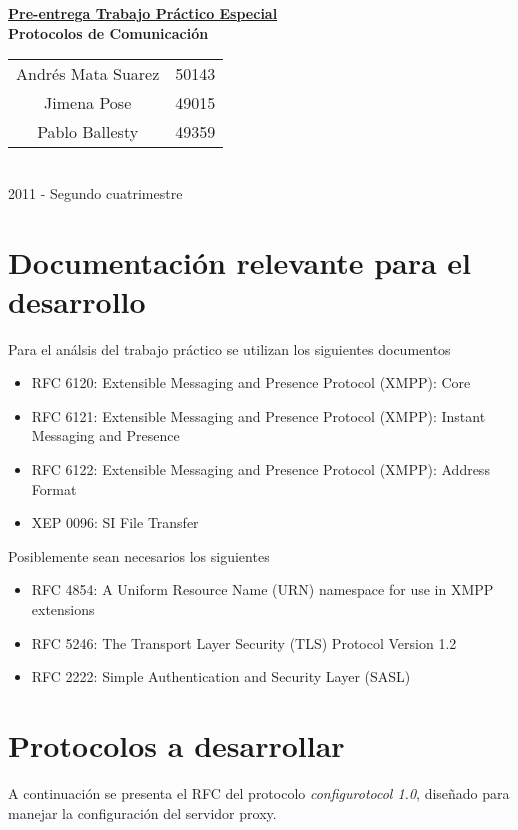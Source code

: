 \documentclass[a4paper,10pt]{article}
\begin{document}
\begin{titlepage}
\begin{center}
 \huge \underline{\textbf{Pre-entrega Trabajo Práctico Especial}}\\[0.05cm]
 \normalsize \textbf{Protocolos de Comunicación}\\[1cm]

\large
\begin{tabular}{c @{ - } l}
 Andrés Mata Suarez & 50143 \\
 Jimena Pose & 49015 \\
 Pablo Ballesty & 49359 \\
\end{tabular}\\[21.4cm]
 2011 - Segundo cuatrimestre
\end{center}

\end{titlepage}

\setcounter{tocdepth}{2}
\tableofcontents


\newpage
\section{Documentación relevante para el desarrollo}

Para el análsis del trabajo práctico se utilizan los siguientes documentos
\begin{itemize}
 \item RFC 6120: Extensible Messaging and Presence Protocol (XMPP): Core
 \item RFC 6121: Extensible Messaging and Presence Protocol (XMPP): Instant Messaging and Presence
 \item RFC 6122: Extensible Messaging and Presence Protocol (XMPP): Address Format
 \item XEP 0096: SI File Transfer
\end{itemize}

Posiblemente sean necesarios los siguientes
\begin{itemize}
 \item RFC 4854: A Uniform Resource Name (URN) namespace for use in XMPP extensions
 \item RFC 5246:  The Transport Layer Security (TLS) Protocol Version 1.2
 \item RFC 2222: Simple Authentication and Security Layer (SASL)
\end{itemize}


\section{Protocolos a desarrollar}
A continuación se presenta el RFC del protocolo \textit{configurotocol 1.0}, diseñado para manejar la configuración
del servidor proxy.
\end{document}
